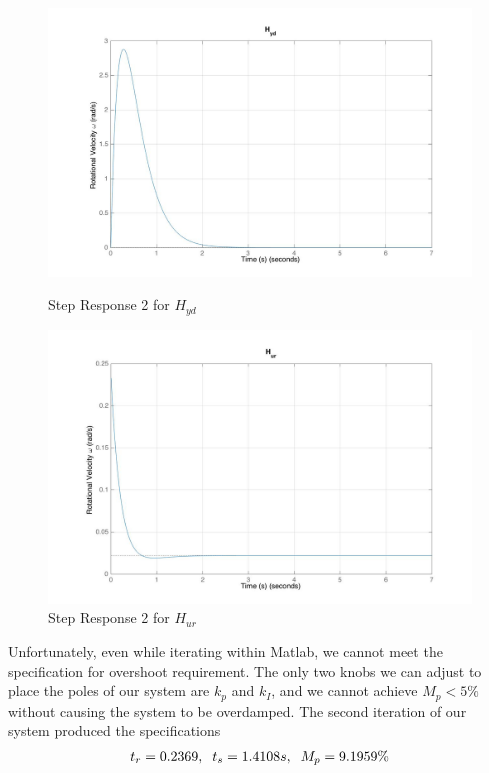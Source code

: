 \documentclass[11pt,titlepage]{article}
\begin{document}
    \begin{figure}[H]
        \centering
        \begin{minipage}{.5\textwidth}
            \centering
            \includegraphics[scale=.18]{Hyd_step2_mat}
            \caption{Step Response 2 for $H_{yd}$}
            \label{fig:Hyd_step2_mat}
        \end{minipage}%
        \begin{minipage}{.5\textwidth}
            \centering
            \includegraphics[scale=.18]{Hur_step2_mat}
            \caption{Step Response 2 for $H_{ur}$}
            \label{fig:Hur_step2_mat}
        \end{minipage}%
    \end{figure}
	
	\noindent Unfortunately, even while iterating within Matlab, we cannot meet the specification for overshoot requirement. The only two knobs we can adjust to place the poles of our system are $k_p$ and $k_I$, and we cannot achieve $M_p<5\%$ without causing the system to be overdamped. The second iteration of our system produced the specifications 
	\begin{align*}
		t_r = 0.2369,\hspace{0.2cm} t_s=1.4108 s, \hspace{0.2cm} M_p=9.1959\%
	\end{align*}
	
\end{document}
